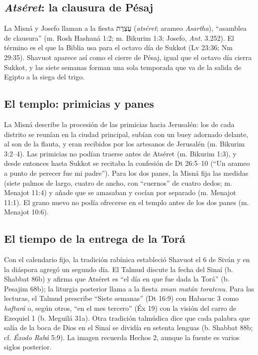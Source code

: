 \documentclass[11pt,letterpaper]{article}
\newcommand{\heb}[1]{\mbox{\foreignlanguage{hebrew}{#1}}}
\begin{document}
\subsection{\emph{Atséret}: la clausura de Pésaj}

La Misná y Josefo llaman a la fiesta \heb{עֲצֶרֶת} (\emph{atséret}; arameo \emph{Asartha}), ``asamblea de clausura'' (m. Rosh Hashaná 1:2; m. Bikurim 1:3; Josefo, \emph{Ant.} 3.252). El término es el que la Biblia usa para el octavo día de Sukkot (Lv 23:36; Nm 29:35). Shavuot aparece así como el cierre de Pésaj, igual que el octavo día cierra Sukkot, y las siete semanas forman una sola temporada que va de la salida de Egipto a la siega del trigo.

\subsection{El templo: primicias y panes}

La Misná describe la procesión de las primicias hacia Jerusalén: los de cada distrito se reunían en la ciudad principal, subían con un buey adornado delante, al son de la flauta, y eran recibidos por los artesanos de Jerusalén (m. Bikurim 3:2--4). Las primicias no podían traerse antes de Atséret (m. Bikurim 1:3), y desde entonces hasta Sukkot se recitaba la confesión de Dt 26:5--10 (``Un arameo a punto de perecer fue mi padre''). Para los dos panes, la Misná fija las medidas (siete palmos de largo, cuatro de ancho, con ``cuernos'' de cuatro dedos; m. Menajot 11:4) y añade que se amasaban y cocían por separado (m. Menajot 11:1). El grano nuevo no podía ofrecerse en el templo antes de los dos panes (m. Menajot 10:6).

\subsection{El tiempo de la entrega de la Torá}

Con el calendario fijo, la tradición rabínica estableció Shavuot el 6 de Siván y en la diáspora agregó un segundo día. El Talmud discute la fecha del Sinaí (b. Shabbat 86b) y afirma que Atséret es ``el día en que fue dada la Torá'' (b. Pesajim 68b); la liturgia posterior llama a la fiesta \emph{zman matán toratenu}. Para las lecturas, el Talmud prescribe ``Siete semanas'' (Dt 16:9) con Habacuc 3 como \emph{haftará} o, según otros, ``en el mes tercero'' (Éx 19) con la visión del carro de Ezequiel 1 (b. Meguilá 31a). Otra tradición talmúdica dice que cada palabra que salía de la boca de Dios en el Sinaí se dividía en setenta lenguas (b. Shabbat 88b; cf. \emph{Éxodo Rabá} 5:9). La imagen recuerda Hechos 2, aunque la fuente es varios siglos posterior.
\end{document}
